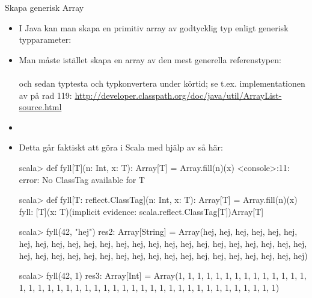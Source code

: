 \begin{Slide}{Skapa generisk Array}\SlideFontTiny
\begin{itemize}
\item I Java kan man  skapa en primitiv array av godtycklig typ enligt generisk typparameter: \sout{}

\item Man måste istället skapa en array av den mest generella referenstypen: \\
 \\
och sedan typtesta och typkonvertera under körtid; se t.ex. implementationen av  på rad 119: \href{http://developer.classpath.org/doc/java/util/ArrayList-source.html}{http://developer.classpath.org/doc/java/util/ArrayList-source.html}

\item[]
\pause
\item Detta går faktiskt att göra i Scala med hjälp av  \pause så här: \\
\begin{REPLnonum}[basicstyle=\ttfamily\SlideFontSize{6}{8}\color{white}]
scala> def fyll[T](n: Int, x: T): Array[T] = Array.fill(n)(x)
<console>:11: error: No ClassTag available for T

scala> def fyll[T: reflect.ClassTag](n: Int, x: T): Array[T] = Array.fill(n)(x)
fyll: [T](x: T)(implicit evidence: scala.reflect.ClassTag[T])Array[T]

scala> fyll(42, "hej")
res2: Array[String] = Array(hej, hej, hej, hej, hej, hej, hej, hej, hej, hej, hej, hej, hej, hej, hej, hej, hej, hej, hej, hej, hej, hej, hej, hej, hej, hej, hej, hej, hej, hej, hej, hej, hej, hej, hej, hej, hej, hej, hej, hej, hej, hej)

scala> fyll(42, 1)
res3: Array[Int] = Array(1, 1, 1, 1, 1, 1, 1, 1, 1, 1, 1, 1, 1, 1, 1, 1, 1, 1, 1, 1, 1, 1, 1, 1, 1, 1, 1, 1, 1, 1, 1, 1, 1, 1, 1, 1, 1, 1, 1, 1, 1, 1)

\end{REPLnonum}


\end{itemize}


\end{Slide}




